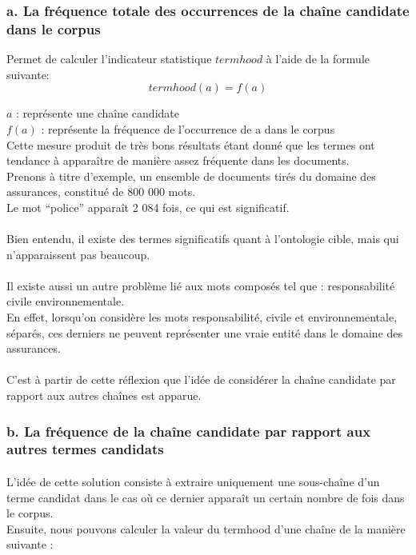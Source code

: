 \documentclass[12pt, a4paper, oneside]{book}
\begin{document}
\subsubsection{a. La fréquence totale des occurrences de la chaîne candidate dans le corpus}

Permet de calculer l'indicateur statistique $termhood$ à l'aide de la formule suivante:
\begin{equation}
termhood(a) = f(a)
\end{equation}

$a$ : représente une chaîne candidate\\
$f(a)$ : représente la fréquence de l'occurrence de a dans le corpus\\

Cette mesure produit de très bons résultats étant donné que les termes ont tendance à apparaître de manière assez fréquente dans les documents.\\
Prenons à titre d'exemple, un ensemble de documents tirés du domaine des assurances, constitué de 800 000 mots.\\ Le mot “police” apparaît 2 084 fois, ce qui est significatif.
\paragraph{}
Bien entendu, il existe des termes significatifs quant à l'ontologie cible, mais qui n'apparaissent pas beaucoup.
\paragraph{}
Il existe aussi un autre problème lié aux mots composés tel que : responsabilité civile environnementale.\\
En effet, lorsqu'on considère les mots responsabilité, civile et environnementale, séparés, ces derniers ne peuvent représenter une vraie entité dans le domaine des assurances.
\paragraph{}
C'est à partir de cette réflexion que l'idée de considérer la chaîne candidate par rapport aux autres chaînes est apparue.

\subsubsection{b. La fréquence de la chaîne candidate par rapport aux autres termes candidats}
\paragraph{}
L'idée de cette solution consiste à extraire uniquement une sous-chaîne d'un terme candidat dans le cas où ce dernier apparaît un certain nombre de fois dans le corpus. \\
Ensuite, nous pouvons calculer la valeur du termhood d'une chaîne de la manière suivante :
\end{document}
